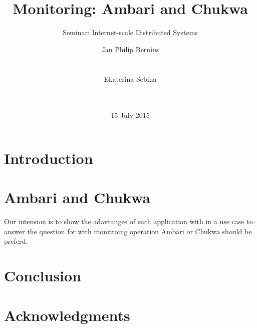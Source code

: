 \documentclass{acm_proc_article-sp}
\begin{document}
\title{Monitoring: Ambari and Chukwa}
\subtitle{Seminar: Internet-scale Distributed Systems}

\author{
\alignauthor
Jan Philip Bernius\\
       \\
       \\
\alignauthor
 Ekaterina Sebina\\
       \\
       \\
}

\date{15 July 2015}

\maketitle

\begin{abstract}
	
\end{abstract}




\section{Introduction}


\section{Ambari and Chukwa}
Our intension is to show the adavtanges of each application with in a use case to answer the question for with monitroing operation Ambari or Chukwa should be preferd.




\section{Conclusion}


\section{Acknowledgments}



\end{document}
